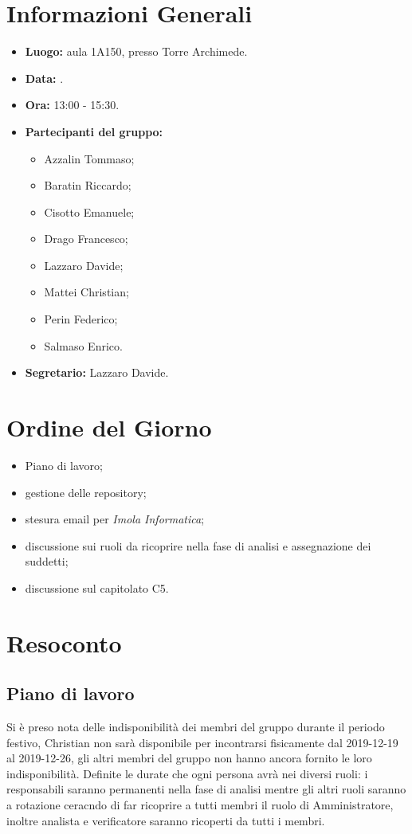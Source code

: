 \section{Informazioni Generali}
\begin{itemize}
\item \textbf{Luogo:} aula 1A150, presso Torre Archimede.
\item \textbf{Data:} \Data.
\item \textbf{Ora:} 13:00 - 15:30.
\item \textbf{Partecipanti del gruppo:}
	\begin{itemize}
		\item Azzalin Tommaso; 
		\item Baratin Riccardo;
		\item Cisotto Emanuele; 
		\item Drago Francesco;
		\item Lazzaro Davide;
		\item Mattei Christian;
		\item Perin Federico;
		\item Salmaso Enrico.
	\end{itemize} 
\item \textbf{Segretario:} Lazzaro Davide.
\end{itemize}


\section{Ordine del Giorno}
\begin{itemize}
\item Piano di lavoro;
\item gestione delle repository;
\item stesura email per \textit{Imola Informatica};
\item discussione sui ruoli da ricoprire nella fase di analisi e assegnazione dei suddetti;
\item discussione sul capitolato C5.
\end{itemize}



\section{Resoconto}
\subsection{Piano di lavoro}
Si è preso nota delle indisponibilità dei membri del gruppo durante il periodo festivo, Christian non sarà disponibile per incontrarsi fisicamente dal 2019-12-19 al 2019-12-26, gli altri membri del gruppo non hanno ancora fornito le loro indisponibilità. 
Definite le durate che ogni persona avrà nei diversi ruoli: i responsabili saranno permanenti nella fase di analisi mentre gli altri ruoli saranno a rotazione ceracndo di far ricoprire a tutti membri il ruolo di Amministratore, inoltre analista e verificatore saranno ricoperti da tutti i membri.  \\

